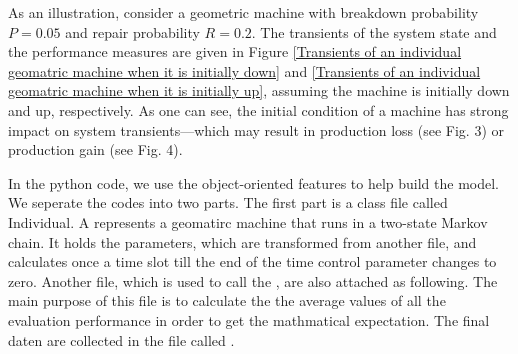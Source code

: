 As an illustration, consider a geometric machine with breakdown probability $P=0.05$ and repair probability $R=0.2$. The transients of the system state and the performance measures are given in Figure \ref{Transients of an individual geomatric machine when it is initially down} and \ref{Transients of an individual geomatric machine when it is initially up}, assuming the machine is initially down and up, respectively. As one can see, the initial condition of a machine has strong impact on system transients—which may result in production loss (see Fig. 3) or production gain (see Fig. 4).

\begin{figure*}[!h]
	\centering
	\caption{Transients of an individual geomatric machine when it is initially down}
	\label{Transients of an individual geomatric machine when it is initially down}
\end{figure*}

\begin{figure*}[!h]
	\centering
	\caption{Transients of an individual geomatric machine when it is initially up}
	\label{Transients of an individual geomatric machine when it is initially up}
\end{figure*}

In the python code, we use the object-oriented features to help build the model. We seperate the codes into two parts. The first part is a class file called Individual. A  represents a geomatirc machine that runs in a two-state Markov chain. It holds the parameters, which are transformed from another file, and calculates once a time slot till the end of the time control parameter  changes to zero.
Another file, which is used to call the , are also attached as following. The main purpose of this file is to calculate the the average values of all the evaluation performance in order to get the mathmatical expectation. The final daten are collected in the file called .
